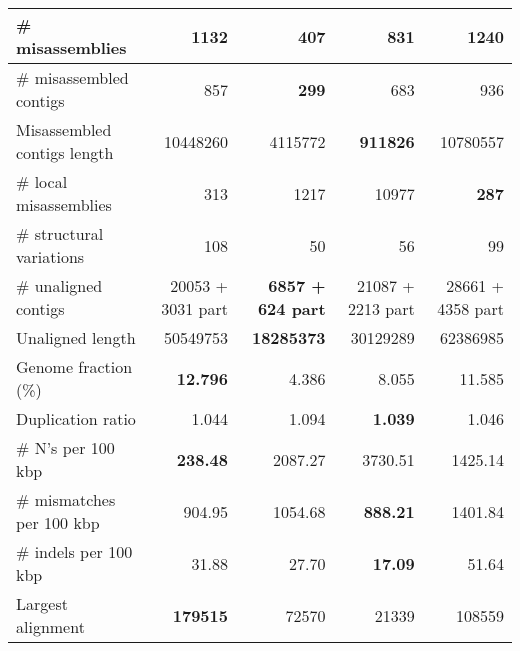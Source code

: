 \documentclass[12pt,a4paper]{article}
\begin{document}
\begin{table}[ht]
\begin{center}
\begin{tabular}{|l*{4}{|r}|}
\# misassemblies & 1132 & {\bf 407} & 831 & 1240 \\ \hline
\# misassembled contigs & 857 & {\bf 299} & 683 & 936 \\ \hline
Misassembled contigs length & 10448260 & 4115772 & {\bf 911826} & 10780557 \\ \hline
\# local misassemblies & 313 & 1217 & 10977 & {\bf 287} \\ \hline
\# structural variations & 108 & 50 & 56 & 99 \\ \hline
\# unaligned contigs & 20053 + 3031 part & {\bf 6857 + 624 part} & 21087 + 2213 part & 28661 + 4358 part \\ \hline
Unaligned length & 50549753 & {\bf 18285373} & 30129289 & 62386985 \\ \hline
Genome fraction (\%) & {\bf 12.796} & 4.386 & 8.055 & 11.585 \\ \hline
Duplication ratio & 1.044 & 1.094 & {\bf 1.039} & 1.046 \\ \hline
\# N's per 100 kbp & {\bf 238.48} & 2087.27 & 3730.51 & 1425.14 \\ \hline
\# mismatches per 100 kbp & 904.95 & 1054.68 & {\bf 888.21} & 1401.84 \\ \hline
\# indels per 100 kbp & 31.88 & 27.70 & {\bf 17.09} & 51.64 \\ \hline
Largest alignment & {\bf 179515} & 72570 & 21339 & 108559 \\ \hline
\end{tabular}
\end{center}
\end{table}
\end{document}
